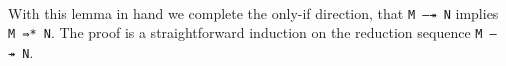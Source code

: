 \begin{fence}
\begin{code}
\AgdaSymbol{\{(}\AgdaSpace{}%
\AgdaSymbol{)}\AgdaSpace{}%
\AgdaSpace{}%
\AgdaSymbol{\}}\AgdaSpace{}%
\AgdaSpace{}%
\AgdaSymbol{=}\AgdaSpace{}%
\AgdaSpace{}%
\AgdaSpace{}%
\<%
\\
\>[0]\AgdaSpace{}%
\AgdaSymbol{\{}\AgdaSymbol{\}}\AgdaSpace{}%
\AgdaSymbol{\{}\AgdaSymbol{\}}\AgdaSpace{}%
\AgdaSymbol{\{}\AgdaSpace{}%
\AgdaSymbol{\}}\AgdaSpace{}%
\AgdaSymbol{(}\AgdaSpace{}%
\AgdaSymbol{)}\AgdaSpace{}%
\AgdaSymbol{=}\AgdaSpace{}%
\AgdaSpace{}%
\AgdaSymbol{(}\AgdaSpace{}%
\AgdaSymbol{)}\<%
\end{code}
\end{fence}

With this lemma in hand we complete the only-if direction, that
\texttt{M\ —↠\ N} implies \texttt{M\ ⇛*\ N}. The proof is a
straightforward induction on the reduction sequence \texttt{M\ —↠\ N}.

